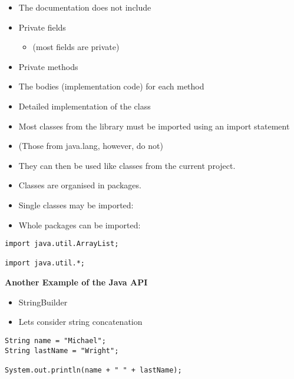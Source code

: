 \documentclass{beamer}
\begin{document}
\begin{frame}
\begin{itemize}
\item The documentation does not include
\item Private fields 
\begin{itemize}
\item (most fields are private) 
\end{itemize}
\item Private methods
\item The bodies (implementation code) for each method
\item Detailed implementation of the class
\end{itemize}
\end{frame} 

\begin{frame}
\begin{itemize}
\item Most classes from the library must be imported using an import statement 
\item (Those from java.lang, however, do not)
\item They can then be used like classes from the current project.
\end{itemize}
\end{frame} 

\begin{frame}[fragile]
\begin{itemize}
\item Classes are organised in packages. 
\item Single classes may be imported:
\item Whole packages can be imported:
\end{itemize}

\begin{block}{}
\begin{lstlisting}
import java.util.ArrayList;

import java.util.*;
\end{lstlisting}
\end{block}
\end{frame} 

\begin{frame}[fragile]
\begin{center}
\textbf{Another Example of the Java API}
\end{center}
\begin{itemize}
\item StringBuilder
\bigskip
\item Lets consider string concatenation 
\end{itemize}

\begin{block}{}
\begin{lstlisting}
String name = "Michael";
String lastName = "Wright";

System.out.println(name + " " + lastName);
\end{lstlisting}
\end{block}
\end{frame}
\end{document}
